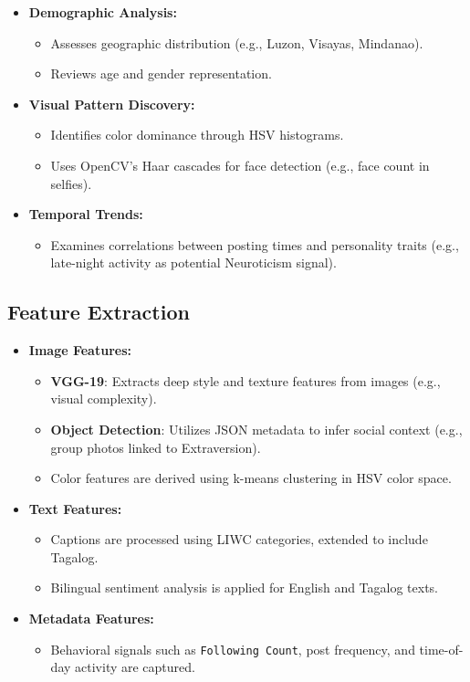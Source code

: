 \begin{itemize}
	\item \textbf{Demographic Analysis:}
	\begin{itemize}
		\item Assesses geographic distribution (e.g., Luzon, Visayas, Mindanao).
		\item Reviews age and gender representation.
	\end{itemize}
	
	\item \textbf{Visual Pattern Discovery:}
	\begin{itemize}
		\item Identifies color dominance through HSV histograms.
		\item Uses OpenCV’s Haar cascades for face detection (e.g., face count in selfies).
	\end{itemize}
	
	\item \textbf{Temporal Trends:}
	\begin{itemize}
		\item Examines correlations between posting times and personality traits (e.g., late-night activity as potential Neuroticism signal).
	\end{itemize}
\end{itemize}

\subsection{Feature Extraction}
\label{subsec:features}

\begin{itemize}
	\item \textbf{Image Features:}
	\begin{itemize}
		\item \textbf{VGG-19}: Extracts deep style and texture features from images (e.g., visual complexity).
		\item \textbf{Object Detection}: Utilizes JSON metadata to infer social context (e.g., group photos linked to Extraversion).
		\item Color features are derived using k-means clustering in HSV color space.
	\end{itemize}
	
	\item \textbf{Text Features:}
	\begin{itemize}
		\item Captions are processed using LIWC categories, extended to include Tagalog.
		\item Bilingual sentiment analysis is applied for English and Tagalog texts.
	\end{itemize}
	
	\item \textbf{Metadata Features:}
	\begin{itemize}
		\item Behavioral signals such as \texttt{Following Count}, post frequency, and time-of-day activity are captured.
	\end{itemize}
\end{itemize}


